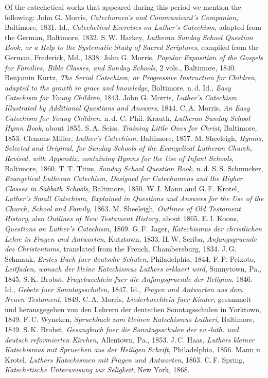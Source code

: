 Of the catechetical works that appeared during this period we mention the following: John G. Morris, \emph{Catechumen’s and Communicant’s}
\emph{Companion}, Baltimore, 1831. Id., \emph{Catechetical Exercises on Luther’s Catechism}, adapted from the German, Baltimore, 1832. S.\,W. Harkey, \emph{Lutheran Sunday School Question Book, or a Help to the Systematic Study of Sacred Scriptures}, compiled from the German, Frederick, Md., 1838. John G. Morris, \emph{Popular Exposition of the Gospels for Families, Bible Classes, and Sunday Schools}, 2 vols., Baltimore, 1840. Benjamin Kurtz, \emph{The Serial Catechism, or Progressive Instruction for Children, adapted to the growth in grace and knowledge}, Baltimore, n.\,d. Id., \emph{Easy Catechism for Young Children}, 1843. John G. Morris, \emph{Luther’s Catechism Illustrated by Additional Questions and Answers}, 1844. C.\,A. Morris, \emph{An Easy Catechism for Young Children}, n.\,d. C. Phil. Krauth, \emph{Lutheran Sunday School Hymn Book}, about 1855. S.\,A. Seiss, \emph{Training Little Ones for Christ}, Baltimore, 1853. Clemens Miller, \emph{Luther’s Catechism}, Baltimore, 1857. M. Sheeleigh, \emph{Hymns, Selected and Original, for Sunday Schools of the Evangelical Lutheran Church, Revised, with Appendix, containing Hymns for the Use of Infant Schools}, Baltimore, 1860. T.\,T. Titus, \emph{Sunday School Question Book}, n.\,d. S.\,S. Schmucker, \emph{Evangelical Lutheran Catechism, Designed for Catechumens and the Higher Classes in Sabbath Schools}, Baltimore, 1850. W.\,I. Mann and G.\,F. Krotel, \emph{Luther’s Small Catechism, Explained in Questions and Answers for the Use of the Church, School and Family}, 1863. M. Sheeleigh, \emph{Outlines of Old Testament History}, also \emph{Outlines of New Testament History}, about 1865. E.\,I. Koons, \emph{Questions on Luther’s Catechism}, 1869. G.\,F. Jager, \emph{Katechismus der christlichen Lehre in Fragen und Antworten}, Kutztown, 1833. H.\,W. Scriba, \emph{Anfangsgruende des Christentums}, translated from the French, Chambersburg, 1834. J.\,G. Schmauk, \emph{Erstes Buch fuer deutsche Schulen}, Philadelphia, 1844. F.\,P. Peixoto, \emph{Leitfaden, wonach der kleine Katechismus Luthers erklaert wird}, Sunnytown, Pa., 1845. S.\,K. Brobst, \emph{Fragebuechlein fuer die Anfangsgruende der Religion}, 1846. Id., \emph{Gebete fuer Sonntagsschulen}, 1847. Id., \emph{Fragen und Antworten aus dem Neuen Testament}, 1849. C.\,A. Morris, \emph{Liederbuechlein fuer Kinder}, gesammelt und herausgegeben von den Lehrern der deutschen Sonntagsschulen in Yorktown, 1849. F.\,C. Wyneken, \emph{Spruchbuch zum kleinen Katechismus Lutheri}, Baltimore, 1849. S.\,K. Brobst, \emph{Gesangbuch fuer die Sonntagsschulen der ev.-luth. und deutsch reformierten Kirchen}, Allentown, Pa., 1853. J.\,C. Haas, \emph{Luthers kleiner Katechismus mit Spruechen aus der Heiligen Schrift}, Philadelphia, 1856. Mann u. Krotel, \emph{Luthers Katechismen mit Fragen und Antworten}, 1863. C.\,F. Spring, \emph{Katechetische Unterweisung zur Seligkeit}, New York, 1868.

